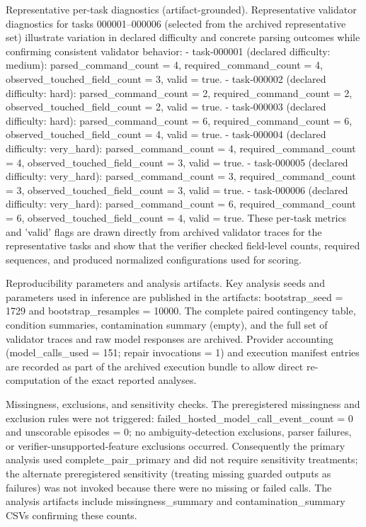 \documentclass[conference]{IEEEtran}
\begin{document}
Representative per-task diagnostics (artifact-grounded). Representative validator diagnostics for tasks 000001--000006 (selected from the archived representative set) illustrate variation in declared difficulty and concrete parsing outcomes while confirming consistent validator behavior:
- task-000001 (declared difficulty: medium): parsed\_command\_count = 4, required\_command\_count = 4, observed\_touched\_field\_count = 3, valid = true.
- task-000002 (declared difficulty: hard): parsed\_command\_count = 2, required\_command\_count = 2, observed\_touched\_field\_count = 2, valid = true.
- task-000003 (declared difficulty: hard): parsed\_command\_count = 6, required\_command\_count = 6, observed\_touched\_field\_count = 4, valid = true.
- task-000004 (declared difficulty: very\_hard): parsed\_command\_count = 4, required\_command\_count = 4, observed\_touched\_field\_count = 3, valid = true.
- task-000005 (declared difficulty: very\_hard): parsed\_command\_count = 3, required\_command\_count = 3, observed\_touched\_field\_count = 3, valid = true.
- task-000006 (declared difficulty: very\_hard): parsed\_command\_count = 6, required\_command\_count = 6, observed\_touched\_field\_count = 4, valid = true.
These per-task metrics and 'valid' flags are drawn directly from archived validator traces for the representative tasks and show that the verifier checked field-level counts, required sequences, and produced normalized configurations used for scoring.

Reproducibility parameters and analysis artifacts. Key analysis seeds and parameters used in inference are published in the artifacts: bootstrap\_seed = 1729 and bootstrap\_resamples = 10000. The complete paired contingency table, condition summaries, contamination summary (empty), and the full set of validator traces and raw model responses are archived. Provider accounting (model\_calls\_used = 151; repair invocations = 1) and execution manifest entries are recorded as part of the archived execution bundle to allow direct re-computation of the exact reported analyses.

Missingness, exclusions, and sensitivity checks. The preregistered missingness and exclusion rules were not triggered: failed\_hosted\_model\_call\_event\_count = 0 and unscorable episodes = 0; no ambiguity-detection exclusions, parser failures, or verifier-unsupported-feature exclusions occurred. Consequently the primary analysis used complete\_pair\_primary and did not require sensitivity treatments; the alternate preregistered sensitivity (treating missing guarded outputs as failures) was not invoked because there were no missing or failed calls. The analysis artifacts include missingness\_summary and contamination\_summary CSVs confirming these counts.
\end{document}
